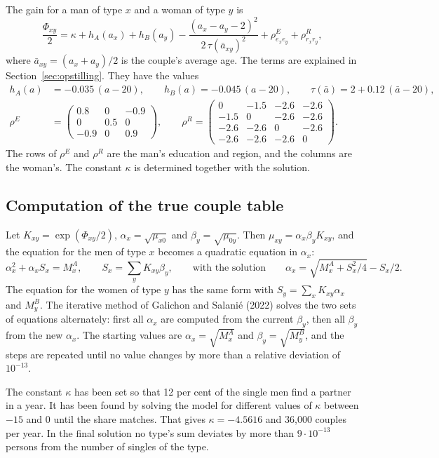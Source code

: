 \documentclass[12pt,a4paper]{article}
\begin{document}
The gain for a man of type $x$ and a woman of type $y$ is
\[
\frac{\Phi_{xy}}{2}=\kappa+h_A(a_x)+h_B(a_y)-\frac{(a_x-a_y-2)^2}{2\,\tau(\bar a_{xy})^2}
+\rho^E_{e_xe_y}+\rho^R_{r_xr_y},
\]
where $\bar a_{xy}=(a_x+a_y)/2$ is the couple's average age. The terms are explained in
Section~\ref{sec:opstilling}. They have the values
\begin{align*}
h_A(a) &= -0.035\,(a-20), \qquad h_B(a) = -0.045\,(a-20), \qquad \tau(\bar a) = 2+0.12\,(\bar a-20),\\
\rho^E &= \begin{pmatrix} 0.8 & 0 & -0.9\\ 0 & 0.5 & 0\\ -0.9 & 0 & 0.9 \end{pmatrix},
\qquad
\rho^R = \begin{pmatrix} 0 & -1.5 & -2.6 & -2.6\\ -1.5 & 0 & -2.6 & -2.6\\ -2.6 & -2.6 & 0 & -2.6\\ -2.6 & -2.6 & -2.6 & 0 \end{pmatrix}.
\end{align*}
The rows of $\rho^E$ and $\rho^R$ are the man's education and region, and the columns are the
woman's. The constant $\kappa$ is determined together with the solution.

\subsection{Computation of the true couple table}

Let $K_{xy}=\exp(\Phi_{xy}/2)$, $\alpha_x=\sqrt{\mu_{x0}}$ and $\beta_y=\sqrt{\mu_{0y}}$. Then
$\mu_{xy}=\alpha_x\beta_yK_{xy}$, and the equation for the men of type $x$ becomes a quadratic
equation in $\alpha_x$:
\[
\alpha_x^2+\alpha_x S_x=M^A_x, \qquad S_x=\sum_yK_{xy}\beta_y,
\qquad\text{with the solution}\qquad
\alpha_x=\sqrt{M^A_x+S_x^2/4}-S_x/2 .
\]
The equation for the women of type $y$ has the same form with $S_y=\sum_xK_{xy}\alpha_x$ and
$M^B_y$. The iterative method of Galichon and Salanié (2022) solves the two sets of equations
alternately: first all $\alpha_x$ are computed from the current $\beta_y$, then all $\beta_y$ from
the new $\alpha_x$. The starting values are $\alpha_x=\sqrt{M^A_x}$ and $\beta_y=\sqrt{M^B_y}$, and
the steps are repeated until no value changes by more than a relative deviation of $10^{-13}$.

The constant $\kappa$ has been set so that 12 per cent of the single men find a partner in a year.
It has been found by solving the model for different values of $\kappa$ between $-15$ and 0 until
the share matches. That gives $\kappa=-4.5616$ and 36,000 couples per year. In the final solution
no type's sum deviates by more than $9\cdot10^{-13}$ persons from the number of singles of the
type.
\end{document}
